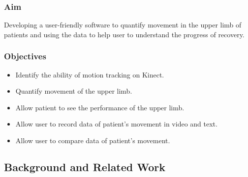 \documentclass[a4paper, 12pt]{article}
\begin{document}
\subsubsection{Aim}
Developing a user-friendly software to quantify movement in the upper limb of patients and using the data to help user to understand the progress of recovery.

\subsubsection{Objectives}

\begin{itemize}
	\item Identify the ability of motion tracking on Kinect.
	\item Quantify movement of the upper limb.
	\item Allow patient to see the performance of the upper limb.
	\item Allow user to record data of patient’s movement in video and text.
	\item Allow user to compare data of patient’s movement.
\end{itemize}

\newpage

\subsection{Background and Related Work}
\end{document}
